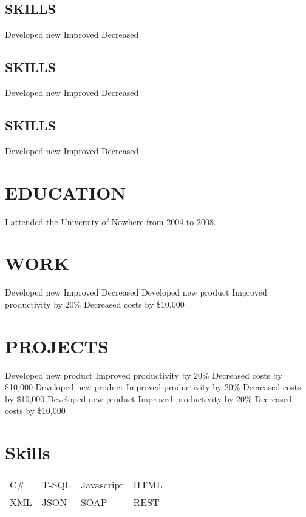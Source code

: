 \documentclass{resume}
\begin{document}
\begin{flushleft}
\end{flushleft}
\begin{minipage}{0.25\textwidth}
\subsection{SKILLS}
\workitems
{Developed new }
{Improved }
{Decreased }
\subsection{SKILLS}
\workitems
{Developed new }
{Improved }
{Decreased }
\subsection{SKILLS}
\workitems
{Developed new }
{Improved }
{Decreased }
\end{minipage}%
\begin{minipage}{0.75\textwidth} 
\section{EDUCATION}
I attended the University of Nowhere from 2004 to 2008.
\\
\section{WORK}
\workitems
{Developed new }
{Improved }
{Decreased }
\workitems
{Developed new product}
{Improved productivity by 20\%}
{Decreased costs by \$10,000}
\section{PROJECTS}
\workitems
{Developed new product}
{Improved productivity by 20\%}
{Decreased costs by \$10,000}
\workitems
{Developed new product}
{Improved productivity by 20\%}
{Decreased costs by \$10,000}
\workitems
{Developed new product}
{Improved productivity by 20\%}
{Decreased costs by \$10,000}
\end{minipage}
\section{Skills} 
\begin{tabular}{l l l l} \\
C\# & T-SQL & Javascript & HTML \\
XML & JSON & SOAP & REST
\end{tabular}
\end{document}
